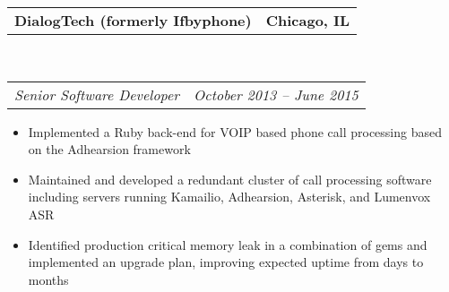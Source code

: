 \documentclass[10pt,letterpaper]{article}
\makeatletter
\newcommand{\headerrow}[2]
{\begin{tabular*}{\linewidth}{l@{\extracolsep{\fill}}r}
	#1 &
	#2 \\
\end{tabular*}}
\newenvironment{indentsection}[1]%
{\begin{list}{}%
	{\setlength{\leftmargin}{#1}}%
	\item[]%
}
{\end{list}}
\makeatother
\begin{document}
\begin{indentsection}{\parindent}
	\headerrow
		{\textbf{DialogTech (formerly Ifbyphone)} }
		{\textbf{Chicago, IL}}
	\\
	\headerrow
		{\emph{Senior Software Developer}}
		{\emph{October 2013 -- June 2015}}

	\begin{itemize}
	\renewcommand{\labelitemi}{$-$}
	\vspace{-0.1in}
    \item Implemented a Ruby back-end for VOIP based phone call processing based on the Adhearsion framework
    \item Maintained and developed a redundant cluster of call processing software including servers running Kamailio, Adhearsion, Asterisk, and Lumenvox ASR
    \item Identified production critical memory leak in a combination of gems and implemented an upgrade plan, improving expected uptime from days to months
	\end{itemize}
\end{indentsection}
\end{document}
